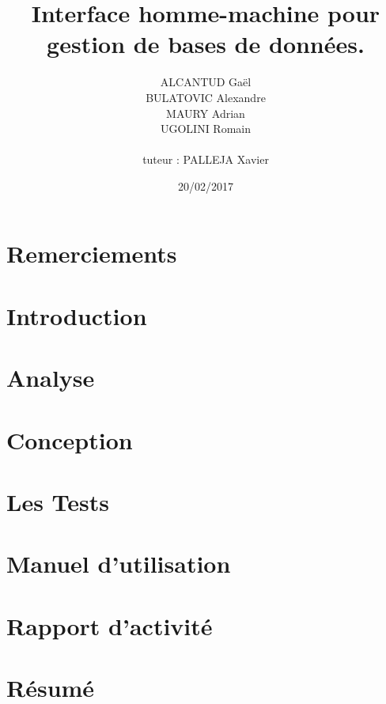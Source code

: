 \documentclass[12pt, a4paper, twoside, openright]{book}
\title{Interface homme-machine pour gestion de bases de données.}
\author{ALCANTUD Gaël \\ BULATOVIC Alexandre \\ MAURY Adrian \\ UGOLINI Romain \\ \\tuteur : PALLEJA Xavier}
\date{20/02/2017}
\begin{document}
\frontmatter
\maketitle

\thispagestyle{empty}
\chapter*{Remerciements}


\tableofcontents
\listoffigures
\printglossaries

\mainmatter
\chapter{Introduction}


\chapter{Analyse}


\chapter{Conception}\label{chapitre_conception}


\chapter{Les Tests}



\chapter{Manuel d'utilisation}


\chapter{Rapport d'activité}


\backmatter

\chapter{Résumé}

\end{document}

